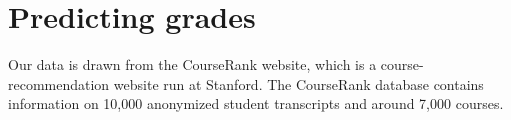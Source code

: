 \documentclass{article} %
\begin{document}


\section{Predicting grades}
Our data is drawn from the CourseRank website, which is a course-recommendation website run at Stanford. The CourseRank database contains information on 10,000 anonymized student transcripts and around 7,000 courses.







%


\end{document}
